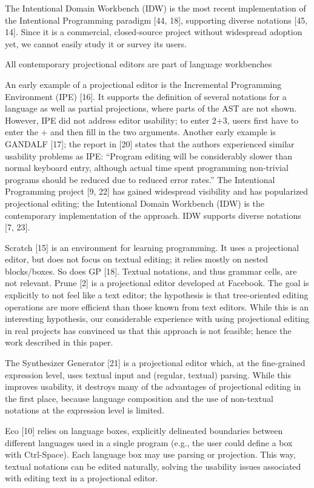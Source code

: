 The Intentional Domain Workbench (IDW) is the most recent implementation of the Intentional Programming paradigm [44, 18], supporting diverse notations [45, 14].
Since it is a commercial, closed-source project without widespread adoption yet, we cannot easily study it or survey its users.


All contemporary projectional editors are part of language workbenches

An early example of a projectional editor is the Incremental Programming Environment (IPE) [16].
It supports the definition of several notations for a language as well as partial projections, where parts of the AST are not shown.
However, IPE did not address editor usability; to enter 2+3, users first have to enter the + and then fill in the two arguments.
Another early example is GANDALF [17]; the report in [20] states that the authors experienced similar usability problems as IPE: “Program editing will be considerably slower than normal keyboard entry, although actual time spent programming non-trivial programs should be reduced due to reduced error rates.”
The Intentional Programming project [9, 22] has gained widespread visibility and has popularized projectional editing; the Intentional Domain Workbench (IDW) is the contemporary implementation of the approach.
IDW supports diverse notations [7, 23].

Scratch [15] is an environment for learning programming.
It uses a projectional editor, but does not focus on textual editing; it relies mostly on nested blocks/boxes.
So does GP [18].
Textual notations, and thus grammar cells, are not relevant.
Prune [2] is a projectional editor developed at Facebook.
The goal is explicitly to not feel like a text editor; the hypothesis is that tree-oriented editing operations are more efficient than those known from text editors.
While this is an interesting hypothesis, our considerable experience with using projectional editing in real projects has convinced us that this approach is not feasible; hence the work described in this paper.

The Synthesizer Generator [21] is a projectional editor which, at the fine-grained expression level, uses textual input and (regular, textual) parsing.
While this improves usability, it destroys many of the advantages of projectional editing in the first place, because language composition and the use of non-textual notations at the expression level is limited.

Eco [10] relies on language boxes, explicitly delineated boundaries between different languages used in a single program (e.g., the user could define a box with Ctrl-Space).
Each language box may use parsing or projection.
This way, textual notations can be edited naturally, solving the usability issues associated with editing text in a projectional editor.

